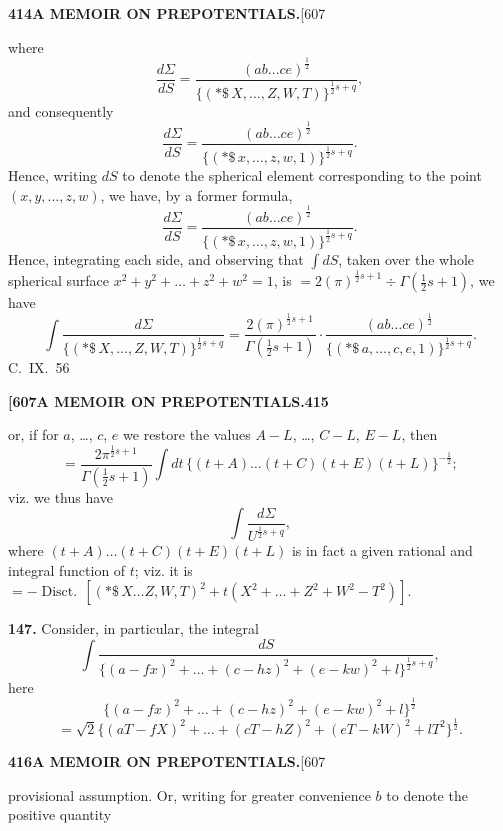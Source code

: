 \documentclass[11pt,a4paper]{article}
\begin{document}
{\newpage
\noindent\textbf{414}\hspace{\fill}\textbf{A MEMOIR ON PREPOTENTIALS.}\hspace{\fill}[607

where
\[
\frac{d\Sigma}{dS} = \frac{(ab\ldots ce)^{\frac{1}{2}}}{\{(*\!\!\$\, X, \ldots, Z, W, T)\}^{\frac{1}{2}s+q}},
\]
and consequently
\[
\frac{d\Sigma}{dS} = \frac{(ab\ldots ce)^{\frac{1}{2}}}{\{(*\!\!\$\, x, \ldots, z, w, 1)\}^{\frac{1}{2}s+q}}.
\]
Hence, writing $dS$ to denote the spherical element corresponding to the point $(x, y, \ldots, z, w)$, we have, by a former formula,
\[
\frac{d\Sigma}{dS} = \frac{(ab\ldots ce)^{\frac{1}{2}}}{\{(*\!\!\$\, x, \ldots, z, w, 1)\}^{\frac{1}{2}s+q}}.
\]
Hence, integrating each side, and observing that $\int dS$, taken over the whole spherical surface $x^2 + y^2 + \ldots + z^2 + w^2 = 1$, is $= 2(\pi)^{\frac{1}{2}s+1} \div \Gamma(\frac{1}{2}s+1)$, we have
\[
\int \frac{d\Sigma}{\{(*\!\!\$\, X, \ldots, Z, W, T)\}^{\frac{1}{2}s+q}} = \frac{2(\pi)^{\frac{1}{2}s+1}}{\Gamma(\frac{1}{2}s+1)} \cdot \frac{(ab\ldots ce)^{\frac{1}{2}}}{\{(*\!\!\$\, a, \ldots, c, e, 1)\}^{\frac{1}{2}s+q}}.
\]
\hfill C.~IX.\ 56

\newpage
\noindent\textbf{[607}\hspace{\fill}\textbf{A MEMOIR ON PREPOTENTIALS.}\hspace{\fill}\textbf{415}

or, if for $a$, \ldots, $c$, $e$ we restore the values $A-L$, \ldots, $C-L$, $E-L$, then
\[
= \frac{2\pi^{\frac{1}{2}s+1}}{\Gamma(\frac{1}{2}s+1)} \int dt\, \{(t+A)\ldots(t+C)(t+E)(t+L)\}^{-\frac{1}{2}};
\]
viz. we thus have
\[
\int \frac{d\Sigma}{U^{\frac{1}{2}s+q}},
\]
where $(t+A)\ldots(t+C)(t+E)(t+L)$ is in fact a given rational and integral function of $t$; viz. it is $= -\operatorname{Disct.}\, [(*\!\!\$\, X\ldots Z, W, T)^2 + t(X^2 + \ldots + Z^2 + W^2 - T^2)]$.

\medskip
\noindent\textbf{147.}
Consider, in particular, the integral
\[
\int \frac{dS}{\{(a-fx)^2 + \ldots + (c-hz)^2 + (e-kw)^2 + l\}^{\frac{1}{2}s+q}},
\]
here
\[
\{(a-fx)^2 + \ldots + (c-hz)^2 + (e-kw)^2 + l\}^{\frac{1}{2}}
\]
\[
= \sqrt{2}\{(aT-fX)^2 + \ldots + (cT-hZ)^2 + (eT-kW)^2 + lT^2\}^{\frac{1}{2}}.
\]

\newpage
\noindent\textbf{416}\hspace{\fill}\textbf{A MEMOIR ON PREPOTENTIALS.}\hspace{\fill}[607

provisional assumption. Or, writing for greater convenience $b$ to denote the positive quantity

}
\end{document}
